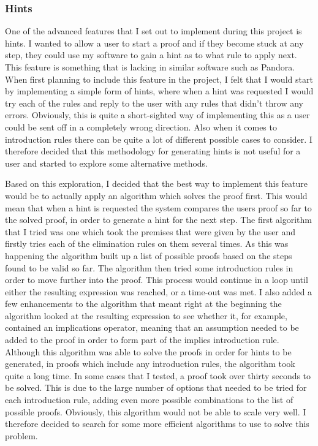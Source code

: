 \subsubsection{Hints}

One of the advanced features that I set out to implement during this project is hints. I wanted to allow a user to start a proof and if they become stuck at any step, they could use my software to gain a hint as to what rule to apply next. This feature is something that is lacking in similar software such as Pandora. When first planning to include this feature in the project,  I felt that I would start by implementing a simple form of hints, where when a hint was requested I would try each of the rules and reply to the user with any rules that didn't throw any errors. Obviously, this is quite a short-sighted way of implementing this as a user could be sent off in a completely wrong direction. Also when it comes to introduction rules there can be quite a lot of different possible cases to consider. I therefore decided that this methodology for generating hints is not useful for a user and started to explore some alternative methods.

Based on this exploration, I decided that the best way to implement this feature would be to actually apply an algorithm which solves the proof first. This would mean that when a hint is requested the system compares the users proof so far to the solved proof, in order to generate a hint for the next step. The first algorithm that I tried was one which took the premises that were given by the user and firstly tries each of the elimination rules on them several times. As this was happening the algorithm built up a list of possible proofs based on the steps found to be valid so far. The algorithm then tried some introduction rules in order to move further into the proof. This process would continue in a loop until either the resulting expression was reached, or a time-out was met. I also added a few enhancements to the algorithm that meant right at the beginning the algorithm looked at the resulting expression to see whether it, for example, contained an implications operator, meaning that an assumption needed to be added to the proof in order to form part of the implies introduction rule. Although this algorithm was able to solve the proofs in order for hints to be generated, in proofs which include any introduction rules, the algorithm took quite a long time. In some cases that I tested, a proof took over thirty seconds to be solved. This is due to the large number of options that needed to be tried for each introduction rule, adding even more possible combinations to the list of possible proofs. Obviously, this algorithm would not be able to scale very well. I therefore decided to search for some more efficient algorithms to use to solve this problem.

